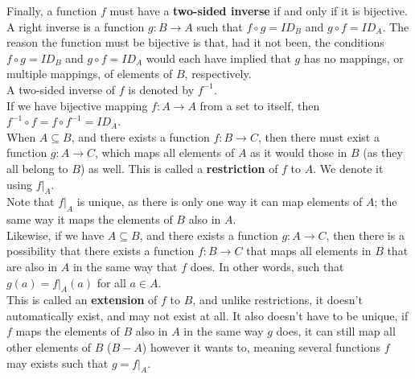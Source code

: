 \documentclass[12pt]{article}
\begin{document}
    Finally, a function $f$ must have a \textbf{two-sided inverse}
    if and only if it is bijective.
    A right inverse is a function $g: B \rightarrow A$
    such that $f \circ g = ID_B$ and $g \circ f = ID_A$.
    The reason the function must be bijective 
    is that, had it not been,
    the conditions $f \circ g = ID_B$ and $g \circ f = ID_A$
    would each have implied that
    $g$ has no mappings, or multiple mappings,
    of elements of $B$, respectively. \\
    A two-sided inverse of $f$ is denoted by $f^{-1}$. \\
    If we have bijective mapping $f: A \rightarrow A$ from a set to itself,
    then $f^{-1} \circ f = f \circ f^{-1} = ID_A$. \\

    When $A \subseteq B$,
    and there exists a function $f: B \to C$,
    then there must exist a function $g: A \to C$,
    which maps all elements of $A$ as it would those in $B$
    (as they all belong to $B$) as well.
    This is called a \textbf{restriction} of $f$ to $A$.
    We denote it using $f|_A$. \\
    Note that $f|_A$ is unique,
    as there is only one way it can map elements of $A$;
    the same way it maps the elements of $B$ also in $A$. \\

    Likewise, if we have $A \subseteq B$,
    and there exists a function $g: A \to C$,
    then there is a possibility that there exists a function
    $f: B \to C$ that maps all elements in $B$ that are also 
    in $A$ in the same way that $f$ does.
    In other words, such that $g(a) = f|_A(a)$ for all $a \in A$. \\
    This is called an \textbf{extension} of $f$ to $B$,
    and unlike restrictions, it doesn't automatically exist,
    and may not exist at all.
    It also doesn't have to be unique,
    if $f$ maps the elements of $B$ also in $A$ in the same
    way $g$ does,
    it can still map all other elements of $B$ ($B - A$)
    however it wants to, 
    meaning several functions $f$ may exists such that 
    $g = f|_A$. \\
\end{document}
